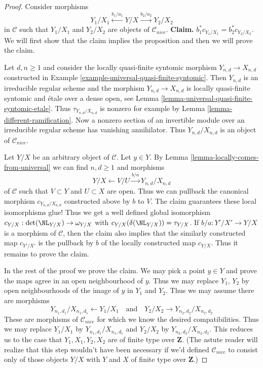 \begin{proof}
\medskip\noindent
Consider morphisms
$$
Y_1/X_1 \xleftarrow{b_1/a_1} Y/X \xrightarrow{b_2/a_2} Y_2/X_2
$$
in $\mathcal{C}$ such that $Y_1/X_1$ and $Y_2/X_2$ are objects
of $\mathcal{C}_{nice}$. {\bf Claim.} $b_1^*c_{Y_1/X_1} = b_2^*c_{Y_2/X_2}$.
We will first show that the claim implies the proposition
and then we will prove the claim.

\medskip\noindent
Let $d, n \geq 1$ and consider the locally
quasi-finite syntomic morphism $Y_{n, d} \to X_{n, d}$
constructed in Example \ref{example-universal-quasi-finite-syntomic}.
Then $Y_{n, d}$ is an irreducible regular scheme and the
morphism $Y_{n, d} \to X_{n, d}$ is locally quasi-finite syntomic
and \'etale over a dense open, see
Lemma \ref{lemma-universal-quasi-finite-syntomic-etale}.
Thus $\tau_{Y_{n, d}/X_{n, d}}$ is nonzero for example by
Lemma \ref{lemma-different-ramification}. Now a nonzero section
of an invertible module over an irreducible regular scheme
has vanishing annihilator. Thus
$Y_{n, d}/X_{n, d}$ is an object of $\mathcal{C}_{nice}$.

\medskip\noindent
Let $Y/X$ be an arbitrary object of $\mathcal{C}$. Let $y \in Y$.
By Lemma \ref{lemma-locally-comes-from-universal} we can find
$n, d \geq 1$ and morphisms
$$
Y/X \leftarrow V/U \xrightarrow{b/a} Y_{n, d}/X_{n, d}
$$
of $\mathcal{C}$ such that $V \subset Y$ and $U \subset X$ are open.
Thus we can pullback the canonical morphism $c_{Y_{n, d}/X_{n, d}}$
constructed above by $b$ to $V$. The claim guarantees these local
isomorphisms glue! Thus we get a well defined global isomorphism
$c_{Y/X} : \det(\NL_{Y/X}) \to \omega_{Y/X}$ with
$c_{Y/X}(\delta(\NL_{Y/X})) = \tau_{Y/X}$.
If $b/a : Y'/X' \to Y/X$ is a morphism of $\mathcal{C}$, then
the claim also implies that the similarly constructed map
$c_{Y'/X'}$ is the pullback by $b$ of the locally constructed
map $c_{Y/X}$. Thus it remains to prove the claim.

\medskip\noindent
In the rest of the proof we prove the claim. We may pick a point
$y \in Y$ and prove the maps agree in an open neighbourhood of $y$.
Thus we may replace $Y_1$, $Y_2$ by open neighbourhoods of the
image of $y$ in $Y_1$ and $Y_2$. Thus we may assume there are
morphisms
$$
Y_{n_1, d_1}/X_{n_1, d_1} \leftarrow Y_1/X_1
\quad\text{and}\quad
Y_2/X_2 \rightarrow Y_{n_2, d_2}/X_{n_2, d_2}
$$
These are morphisms of $\mathcal{C}_{nice}$ for which we know the
desired compatibilities. Thus we may replace
$Y_1/X_1$ by $Y_{n_1, d_1}/X_{n_1, d_1}$ and
$Y_2/X_2$ by $Y_{n_2, d_2}/X_{n_2, d_2}$. This reduces us to the
case that $Y_1, X_1, Y_2, X_2$ are of finite type over $\mathbf{Z}$.
(The astute reader will realize that this step wouldn't have been
necessary if we'd defined $\mathcal{C}_{nice}$ to consist only
of those objects $Y/X$ with $Y$ and $X$ of finite type over $\mathbf{Z}$.)


\end{proof}
